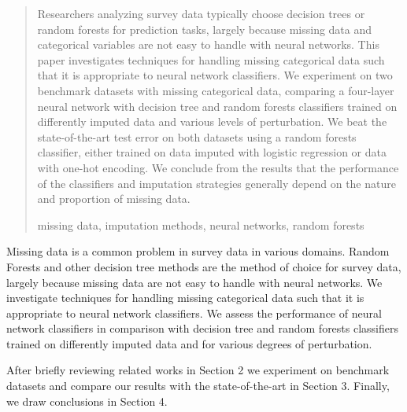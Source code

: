 \documentclass[10pt]{book}
\theoremstyle{definition}
\begin{document}
\begin{quotation}
Researchers analyzing survey data typically choose decision trees or random forests for prediction tasks, largely because missing data and categorical variables are not easy to handle with neural networks. This paper investigates techniques for handling missing categorical data such that it is appropriate to neural network classifiers. We experiment on two benchmark datasets with missing categorical data, comparing a four-layer neural network with decision tree and random forests classifiers trained on differently imputed data and various levels of perturbation. We beat the state-of-the-art test error on both datasets using a random forests classifier, either trained on data imputed with logistic regression or data with one-hot encoding. We conclude from the results that the performance of the classifiers and imputation strategies generally depend on the nature and proportion of missing data. \par

\vspace{9pt}
missing data, imputation methods, neural networks, random forests
\par
\end{quotation}\par



\def\thefigure{\arabic{figure}}
\def\thetable{\arabic{table}}

\fontsize{12}{14pt plus.8pt minus .6pt}\selectfont

\setcounter{chapter}{1}
\setcounter{equation}{0} %

Missing data is a common problem in survey data in various domains. Random Forests and other decision tree methods are the method of choice for survey data, largely because missing data are not easy to handle with neural networks. We investigate techniques for handling missing categorical data such that it is appropriate to neural network classifiers. We assess the performance of neural network classifiers in comparison with decision tree and random forests classifiers trained on differently imputed data and for various degrees of perturbation.

After briefly reviewing related works in Section 2 we experiment on benchmark datasets and compare our results with the state-of-the-art in Section 3. Finally, we draw conclusions in Section 4.
\par
\end{document}
